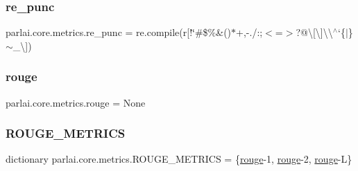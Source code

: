 \subsubsection{\texorpdfstring{re\+\_\+punc}{re\_punc}}
{\footnotesize\ttfamily parlai.\+core.\+metrics.\+re\+\_\+punc = re.\+compile(r\textquotesingle{}\mbox{[}!\char`\"{}\#\$\%\&()$\ast$+,-\/./\+:;$<$=$>$?@\textbackslash{}\mbox{[}\textbackslash{}\mbox{]}\textbackslash{}\textbackslash{}$^\wedge$`\{$\vert$\}$\sim$\+\_\+\textbackslash{}\textquotesingle{}\mbox{]}\textquotesingle{})}

\mbox{\label{namespaceparlai_1_1core_1_1metrics_ae0fddd2325f5dc52b2a367e52056242a}} 
\subsubsection{\texorpdfstring{rouge}{rouge}}
{\footnotesize\ttfamily parlai.\+core.\+metrics.\+rouge = None}

\mbox{\label{namespaceparlai_1_1core_1_1metrics_ac01c4a05e91baee81e771e8f7ae9e7e4}} 
\subsubsection{\texorpdfstring{R\+O\+U\+G\+E\+\_\+\+M\+E\+T\+R\+I\+CS}{ROUGE\_METRICS}}
{\footnotesize\ttfamily dictionary parlai.\+core.\+metrics.\+R\+O\+U\+G\+E\+\_\+\+M\+E\+T\+R\+I\+CS = \{\textquotesingle{}\hyperlink{namespaceparlai_1_1core_1_1metrics_ae0fddd2325f5dc52b2a367e52056242a}{rouge}-\/1\textquotesingle{}, \textquotesingle{}\hyperlink{namespaceparlai_1_1core_1_1metrics_ae0fddd2325f5dc52b2a367e52056242a}{rouge}-\/2\textquotesingle{}, \textquotesingle{}\hyperlink{namespaceparlai_1_1core_1_1metrics_ae0fddd2325f5dc52b2a367e52056242a}{rouge}-\/L\textquotesingle{}\}}

